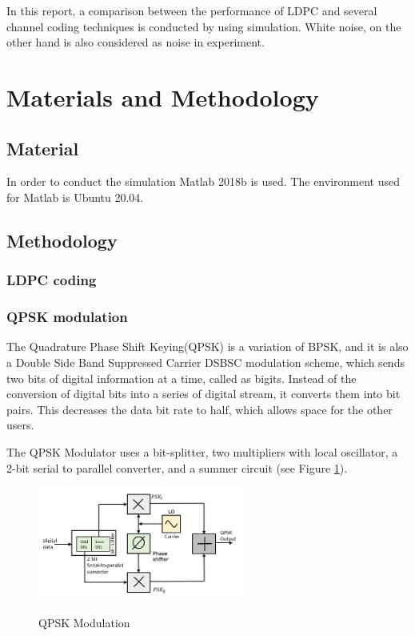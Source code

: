\documentclass{article}
\begin{document}
	In this report, a comparison between the performance of LDPC and several channel coding techniques is conducted by using simulation. White noise, on the other hand is also considered as noise in experiment. 
	
	\section{Materials and Methodology}
	\subsection{Material}
	In order to conduct the simulation Matlab 2018b is used. The environment used for Matlab is Ubuntu 20.04. 
	\subsection{Methodology} 
	\subsubsection{LDPC coding}
	\subsubsection{QPSK modulation}
	The Quadrature Phase Shift Keying(QPSK) is a variation of BPSK, and it is also a Double Side Band Suppressed Carrier DSBSC modulation scheme, which sends two bits of digital information at a time, called as bigits. Instead of the conversion of digital bits into a series of digital stream, it converts them into bit pairs. This decreases the data bit rate to half, which allows space for the other users.
	
	The QPSK Modulator uses a bit-splitter, two multipliers with local oscillator, a 2-bit serial to parallel converter, and a summer circuit (see Figure \ref{fig:qpsk_mo}). 
	
	\begin{figure}[h]
		\caption{QPSK Modulation}
		\centering
		\includegraphics[width=0.6\textwidth]{imgs/qpsk_modulator}
		\label{fig:qpsk_mo}
	\end{figure}
\end{document}
